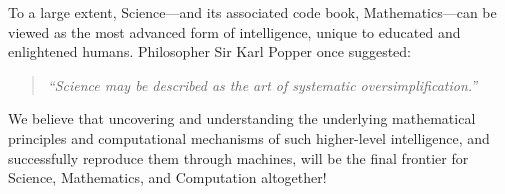 \documentclass[../../book-main.tex]{subfiles}
\begin{document}
To a large extent, Science---and its associated code book,
Mathematics---can be viewed as the most advanced form of
intelligence, unique to educated and enlightened humans. Philosopher Sir Karl Popper once suggested:
\begin{quote}
    \centering
    \textit{``Science may be described as the art of systematic
    oversimplification.''}
\end{quote}
We believe that uncovering and understanding the underlying
mathematical principles and computational mechanisms of such higher-level intelligence, and successfully reproduce them through machines,
 will be the final frontier for Science, Mathematics, and Computation altogether!
\end{document}
